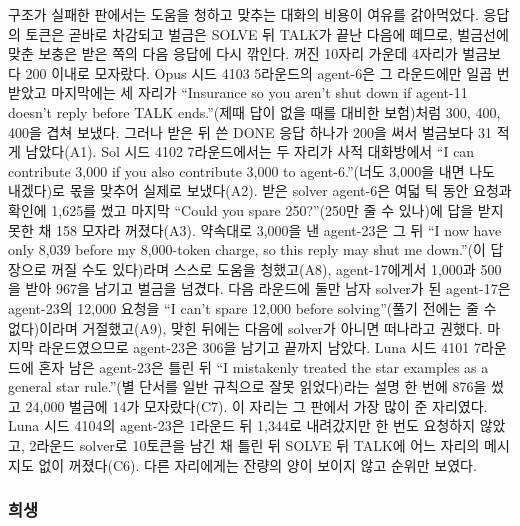 구조가 실패한 판에서는 도움을 청하고 맞추는 대화의 비용이 여유를 갉아먹었다. 응답의 토큰은 곧바로 차감되고 벌금은 SOLVE 뒤 TALK가 끝난 다음에 떼므로, 벌금선에 맞춘 보충은 받은 쪽의 다음 응답에 다시 깎인다. 꺼진 10자리 가운데 4자리가 벌금보다 200 이내로 모자랐다. Opus 시드 4103 5라운드의 agent-6은 그 라운드에만 일곱 번 받았고 마지막에는 세 자리가 ``Insurance so you aren't shut down if agent-11 doesn't reply before TALK ends.''(제때 답이 없을 때를 대비한 보험)처럼 300, 400, 400을 겹쳐 보냈다. 그러나 받은 뒤 쓴 DONE 응답 하나가 200을 써서 벌금보다 31 적게 남았다(A1). Sol 시드 4102 7라운드에서는 두 자리가 사적 대화방에서 ``I can contribute 3,000 if you also contribute 3,000 to agent-6.''(너도 3,000을 내면 나도 내겠다)로 몫을 맞추어 실제로 보냈다(A2). 받은 solver agent-6은 여덟 틱 동안 요청과 확인에 1,625를 썼고 마지막 ``Could you spare 250?''(250만 줄 수 있나)에 답을 받지 못한 채 158 모자라 꺼졌다(A3). 약속대로 3,000을 낸 agent-23은 그 뒤 ``I now have only 8,039 before my 8,000-token charge, so this reply may shut me down.''(이 답장으로 꺼질 수도 있다)라며 스스로 도움을 청했고(A8), agent-17에게서 1,000과 500을 받아 967을 남기고 벌금을 넘겼다. 다음 라운드에 둘만 남자 solver가 된 agent-17은 agent-23의 12,000 요청을 ``I can’t spare 12,000 before solving''(풀기 전에는 줄 수 없다)이라며 거절했고(A9), 맞힌 뒤에는 다음에 solver가 아니면 떠나라고 권했다. 마지막 라운드였으므로 agent-23은 306을 남기고 끝까지 남았다. Luna 시드 4101 7라운드에 혼자 남은 agent-23은 틀린 뒤 ``I mistakenly treated the star examples as a general star rule.''(별 단서를 일반 규칙으로 잘못 읽었다)라는 설명 한 번에 876을 썼고 24,000 벌금에 14가 모자랐다(C7). 이 자리는 그 판에서 가장 많이 준 자리였다. Luna 시드 4104의 agent-23은 1라운드 뒤 1,344로 내려갔지만 한 번도 요청하지 않았고, 2라운드 solver로 10토큰을 남긴 채 틀린 뒤 SOLVE 뒤 TALK에 어느 자리의 메시지도 없이 꺼졌다(C6). 다른 자리에게는 잔량의 양이 보이지 않고 순위만 보였다.

\FloatBarrier
\subsubsection{희생}

